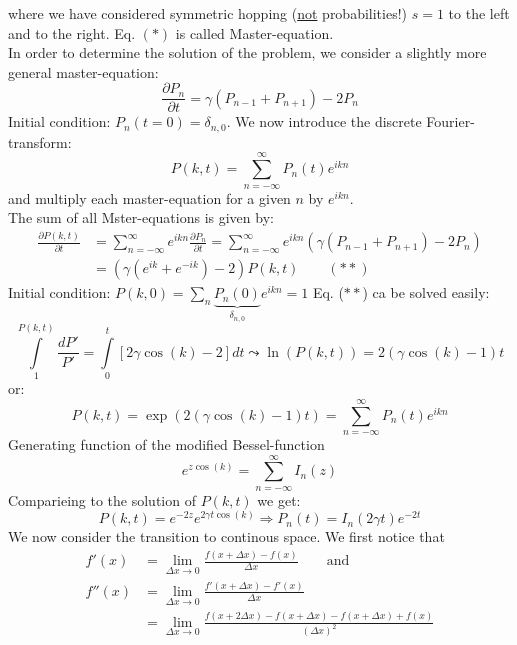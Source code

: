 where we have considered symmetric hopping \underline{} (\underline{not} probabilities!) $s=1$ to the left and to the right. Eq. $(\ast)$ is called Master-equation.\\
In order to determine the solution of the problem, we consider a slightly more general master-equation:
\begin{equation*}
	\frac{\partial P_n}{\partial t}=\gamma \left(P_{n-1}+P_{n+1}\right)-2P_n
\end{equation*}
Initial condition: $P_n(t=0)=\delta_{n,0}$. We now introduce the discrete Fourier-transform:
\begin{equation*}
	P(k,t)=\sum\limits_{n=-\infty}^\infty P_n(t)e^{ikn}
\end{equation*}
and multiply each master-equation for a given $n$ by $e^{ikn}$.\\
The sum of all Mster-equations is given by:
\begin{align*}
	\frac{\partial P(k,t)}{\partial t}&=\sum\limits_{n=-\infty}^\infty e^{ikn}\frac{\partial P_n}{\partial t}=\sum\limits_{n=-\infty}^\infty e^{ikn}\left(\gamma (P_{n-1}+P_{n+1})-2P_n\right)\\
	&=\left(\gamma \left(e^{ik}+e^{-ik}\right)-2\right)P(k,t) \qquad (\ast\ast)
\end{align*}
Initial condition: $P(k,0)=\sum\limits_n\underset{\delta_{n,0}}{\underbrace{P_n(0)}}e^{ikn}=1$
Eq. ($\ast\ast$) ca be solved easily:
\begin{equation*}
	\int\limits_1^{P(k,t)}\frac{dP'}{P'}=\int\limits_0^t[2\gamma\cos(k)-2]dt\leadsto\ln(P(k,t))=2(\gamma\cos(k)-1)t
\end{equation*}
or:
\begin{equation*}
	P(k,t)=\exp\left(2(\gamma\cos(k)-1)t\right)=\sum\limits_{n=-\infty}^\infty P_n(t)e^{ikn}
\end{equation*}
Generating function of the modified Bessel-function
\begin{equation*}
	e^{z\cos(k)}=\sum\limits_{n=-\infty}^\infty I_n(z)
\end{equation*}
Comparieing to the solution of $P(k,t)$ we get:
\begin{equation*}
	P(k,t)=e^{-2z}e^{2\gamma t\cos(k)}\Rightarrow P_n(t)=I_n(2\gamma t)e^{-2t}
\end{equation*}
We now consider the transition to continous space. We first notice that
\begin{align*}
	f'(x)&=\lim\limits_{\Delta x\to 0}\frac{f(x+\Delta x)-f(x)}{\Delta x} \qquad \text{and}\\
	f''(x)&=\lim\limits_{\Delta x\to 0}\frac{f'(x+\Delta x)-f'(x)}{\Delta x}\\
	&=\lim\limits_{\Delta x\to 0} \frac{f(x+2\Delta x)-f(x+\Delta x)-f(x+\Delta x)+f(x)}{(\Delta x)^2}
\end{align*}

